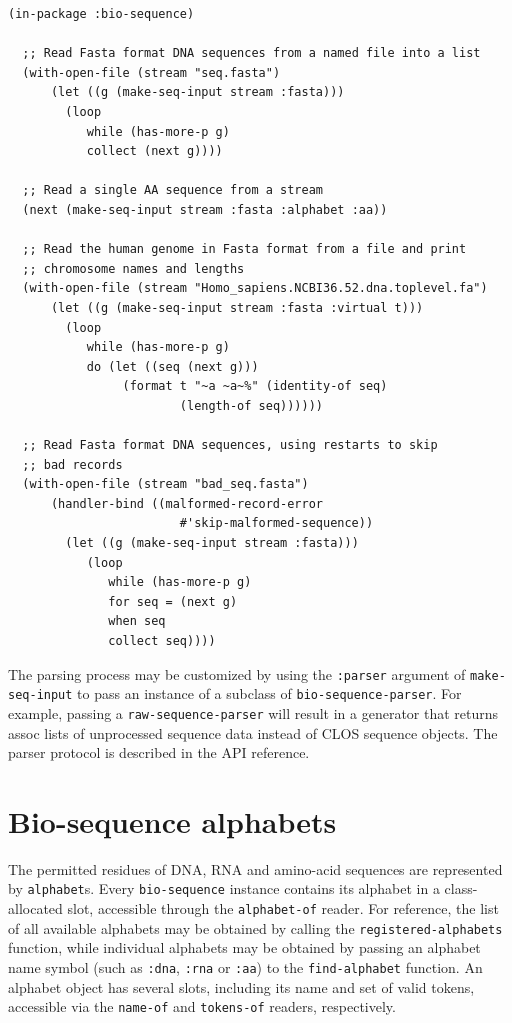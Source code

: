 \documentclass[a4paper, 12pt]{article}
\begin{document}
\begin{lstlisting}[caption={Making sequences from streams},
  label=lst:read-bioseq-stream]
  (in-package :bio-sequence)
  
  ;; Read Fasta format DNA sequences from a named file into a list
  (with-open-file (stream "seq.fasta")
      (let ((g (make-seq-input stream :fasta)))
        (loop
           while (has-more-p g)
           collect (next g))))

  ;; Read a single AA sequence from a stream
  (next (make-seq-input stream :fasta :alphabet :aa))

  ;; Read the human genome in Fasta format from a file and print
  ;; chromosome names and lengths
  (with-open-file (stream "Homo_sapiens.NCBI36.52.dna.toplevel.fa")
      (let ((g (make-seq-input stream :fasta :virtual t)))
        (loop
           while (has-more-p g)
           do (let ((seq (next g)))
                (format t "~a ~a~%" (identity-of seq)
                        (length-of seq))))))

  ;; Read Fasta format DNA sequences, using restarts to skip
  ;; bad records
  (with-open-file (stream "bad_seq.fasta")
      (handler-bind ((malformed-record-error
                        #'skip-malformed-sequence))
        (let ((g (make-seq-input stream :fasta)))
           (loop
              while (has-more-p g)
              for seq = (next g)
              when seq
              collect seq))))
\end{lstlisting}

The parsing process may be customized by using the \lstinline!:parser!
argument of \lstinline!make-seq-input! to pass an instance of a
subclass of \lstinline!bio-sequence-parser!. For example, passing a
\lstinline!raw-sequence-parser!  will result in a generator that
returns assoc lists of unprocessed sequence data instead of CLOS
sequence objects. The parser protocol is described in the API
reference.


\section{Bio-sequence alphabets}
\label{sec:alphabet-bioseq}

The permitted residues of DNA, RNA and amino-acid sequences are
represented by \lstinline!alphabet!s. Every \lstinline!bio-sequence!
instance contains its alphabet in a class-allocated slot, accessible
through the \lstinline!alphabet-of! reader. For reference, the list of
all available alphabets may be obtained by calling the
\lstinline!registered-alphabets! function, while individual alphabets
may be obtained by passing an alphabet name symbol (such as
\lstinline!:dna!, \lstinline!:rna! or \lstinline!:aa!) to the
\lstinline!find-alphabet! function. An alphabet object has several
slots, including its name and set of valid tokens, accessible via the
\lstinline!name-of! and \lstinline!tokens-of! readers, respectively.
\end{document}
